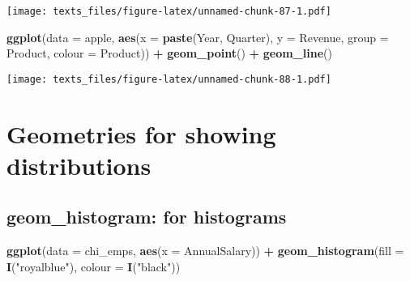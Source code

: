\documentclass[]{book}
\newenvironment{Shaded}{\begin{snugshade}}{\end{snugshade}}
\newcommand{\DataTypeTok}[1]{\textcolor[rgb]{0.13,0.29,0.53}{#1}}
\newcommand{\KeywordTok}[1]{\textcolor[rgb]{0.13,0.29,0.53}{\textbf{#1}}}
\newcommand{\NormalTok}[1]{#1}
\newcommand{\OperatorTok}[1]{\textcolor[rgb]{0.81,0.36,0.00}{\textbf{#1}}}
\newcommand{\StringTok}[1]{\textcolor[rgb]{0.31,0.60,0.02}{#1}}
\begin{document}
\begin{Shaded}
\end{Shaded}

\texttt{[image: texts\_files/figure-latex/unnamed-chunk-87-1.pdf]}

\begin{Shaded}
\begin{Highlighting}[]
\KeywordTok{ggplot}\NormalTok{(}\DataTypeTok{data =}\NormalTok{ apple, }\KeywordTok{aes}\NormalTok{(}\DataTypeTok{x =} \KeywordTok{paste}\NormalTok{(Year, Quarter), }\DataTypeTok{y =}\NormalTok{ Revenue, }\DataTypeTok{group =}\NormalTok{ Product, }\DataTypeTok{colour =}\NormalTok{ Product)) }\OperatorTok{+}\StringTok{ }
\StringTok{  }\KeywordTok{geom_point}\NormalTok{() }\OperatorTok{+}
\StringTok{  }\KeywordTok{geom_line}\NormalTok{()}
\end{Highlighting}
\end{Shaded}

\texttt{[image: texts\_files/figure-latex/unnamed-chunk-88-1.pdf]}

\hypertarget{geomdist}{%
\section*{Geometries for showing distributions}\label{geomdist}}

\hypertarget{geomhistogram}{%
\subsection*{\texorpdfstring{\textbf{geom\_histogram}: for histograms}{geom\_histogram: for histograms}}\label{geomhistogram}}

\begin{Shaded}
\begin{Highlighting}[]
\KeywordTok{ggplot}\NormalTok{(}\DataTypeTok{data =}\NormalTok{ chi_emps, }\KeywordTok{aes}\NormalTok{(}\DataTypeTok{x =}\NormalTok{ AnnualSalary)) }\OperatorTok{+}\StringTok{ }
\StringTok{  }\KeywordTok{geom_histogram}\NormalTok{(}\DataTypeTok{fill =} \KeywordTok{I}\NormalTok{(}\StringTok{"royalblue"}\NormalTok{), }\DataTypeTok{colour =} \KeywordTok{I}\NormalTok{(}\StringTok{"black"}\NormalTok{))}
\end{Highlighting}
\end{Shaded}
\end{document}
